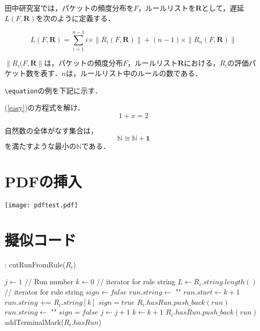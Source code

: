 \documentclass[10pt,twocolumn]{jarticle}
\begin{document}
田中研究室では，パケットの頻度分布を$F$，ルールリストを${\mathbf R}$として，遅延$L(F, {\mathbf R})$を次のように定義する．

\[
 L(F, {\mathbf R}) = \sum_{i=1}^{n-1} i \times \| R_{i}(F, {\mathbf R})\| + (n-1) \times \| R_{n}(F, {\mathbf R})\| 
\]

$\|R_{i}(F, {\mathbf R}\|$は，パケットの頻度分布$F$，ルールリスト${\mathbf R}$における，$R_{i}$の評価パケット数を表す．$n$は，ルールリスト中のルールの数である．

\par

\verb|\equation|の例を下記に示す．\par
(\ref{easy})の方程式を解け．
\begin{equation}
 1 + x = 2
 \label{easy}
\end{equation}

自然数の全体がなす集合は，
\begin{equation}
\mathbb{N} \cong \mathbb{N} + \mathbf{1}
 \label{nat}
\end{equation}
を満たすような最小の$\mathbb{N}$である．

\section{PDFの挿入}
 \texttt{[image: pdftest.pdf]}

\section{擬似コード}
\begin{algorithm}[H]
\caption{: cutRunFromRule($R_{i}$)}
\label{cut_run}
\begin{algorithmic}[1]
 \STATE $j \leftarrow 1$ // Run number
 \STATE $k \leftarrow 0$ // iterator for rule string
 \STATE $L \leftarrow R_{i}.string.length()$ // iterator for rule string
 \STATE $sign \leftarrow false$
 \STATE $run.string \leftarrow$ ""
    \STATE $run.start \leftarrow k + 1$
   \ENDIF
   \STATE $run.string$ += $R_{i}.string[k]$
   \STATE $sign = true$
  \ELSE                              %
    \STATE $R_{i}.hasRun.push\_back(run)$
    \STATE $run.string \leftarrow$ ""
    \STATE $sign = false$
    \STATE $j \leftarrow j + 1$
   \ENDIF
  \ENDIF
  \STATE $k \leftarrow k + 1$
 \ENDWHILE
  \STATE $R_{i}.hasRun.push\_back(run)$
 \ENDIF
\STATE addTerminalMark($R_{i}.hasRun$) 
\end{algorithmic}
\end{algorithm}
\end{document}
